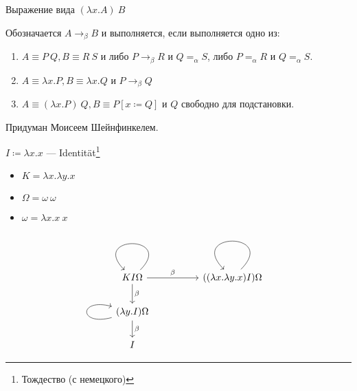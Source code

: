 \begin{definition}
    Выражение вида \((\lambda x.A)\ B\)
\end{definition}

\begin{definition}
    Обозначается \(A \to_\beta B\) и выполняется, если выполняется одно из:
    \begin{enumerate}
        \item \(A \equiv P\ Q, B \equiv R\ S\) и либо \(P \to_\beta R\) и \(Q =_\alpha S\), либо \(P =_\alpha R\) и \(Q =_\alpha S\).
        \item \(A \equiv \lambda x.P, B \equiv \lambda x.Q\) и \(P \to_\beta Q\)
        \item \(A \equiv (\lambda x.P)\ Q, B \equiv P [x \coloneqq Q]\) и \(Q\) свободно для подстановки.
    \end{enumerate}
\end{definition}

\begin{definition}
    Придуман Моисеем Шейнфинкелем.

    \(I \coloneqq \lambda x.x\) --- Identit\"
    at\footnote{Тождество (с немецкого)}
\end{definition}

\begin{definition}\itemfix
    \begin{itemize}
        \item \(K = \lambda x.\lambda y.x\)
        \item \(\Omega = \omega\ \omega\)
        \item \(\omega = \lambda x.x\ x\)
    \end{itemize}
\end{definition}

\begin{example}
    \[\begin{tikzcd}[ampersand replacement=\&]
            KI\Omega \arrow{rr}{\beta} \arrow{d}{\beta} \arrow[loop] \&  \& ((\lambda x.\lambda y.x) I) \Omega \arrow[loop] \\
            (\lambda y.I) \Omega \arrow[loop left] \arrow{d}{\beta}                                                              \&  \&                                                                                          \\
            I                                                                                                    \&  \&
        \end{tikzcd}\]
\end{example}

